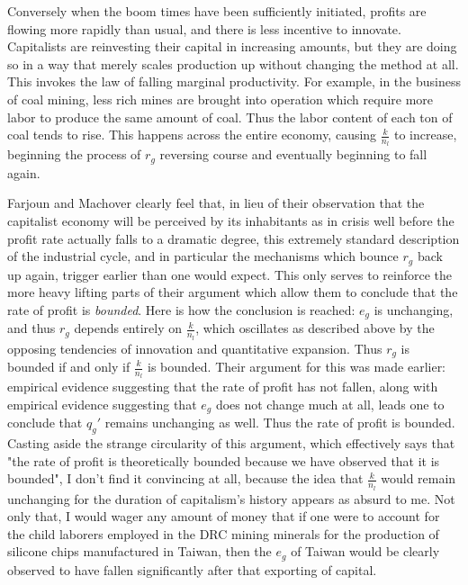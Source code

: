 Conversely when the boom times have been sufficiently initiated, profits are flowing more rapidly than usual, and there is less incentive to innovate. Capitalists are reinvesting their capital in increasing amounts, but they are doing so in a way that merely scales production up without changing the method at all. This invokes the law of falling marginal productivity. For example, in the business of coal mining, less rich mines are brought into operation which require more labor to produce the same amount of coal. Thus the labor content of each ton of coal tends to rise. This happens across the entire economy, causing $\frac{k}{n_l}$ to increase, beginning the process of $r_g$ reversing course and eventually beginning to fall again. \par 
Farjoun and Machover clearly feel that, in lieu of their observation that the capitalist economy will be perceived by its inhabitants as in crisis well before the profit rate actually falls to a dramatic degree, this extremely standard description of the industrial cycle, and in particular the mechanisms which bounce $r_g$ back up again, trigger earlier than one would expect. This only serves to reinforce the more heavy lifting parts of their argument which allow them to conclude that the rate of profit is \textit{bounded}. Here is how the conclusion is reached: $e_g$ is unchanging, and thus $r_g$ depends entirely on $\frac{k}{n_l}$, which oscillates as described above by the opposing tendencies of innovation and quantitative expansion. Thus $r_g$ is bounded if and only if $\frac{k}{n_l}$ is bounded. Their argument for this was made earlier: empirical evidence suggesting that the rate of profit has not fallen, along with empirical evidence suggesting that $e_g$ does not change much at all, leads one to conclude that $q_g'$ remains unchanging as well. Thus the rate of profit is bounded. Casting aside the strange circularity of this argument, which effectively says that "the rate of profit is theoretically bounded because we have observed that it is bounded", I don't find it convincing at all, because the idea that $\frac{k}{n_l}$ would remain unchanging for the duration of capitalism's history appears as absurd to me. Not only that, I would wager any amount of money that if one were to account for the child laborers employed in the DRC mining minerals for the production of silicone chips manufactured in Taiwan, then the $e_g$ of Taiwan would be clearly observed to have fallen significantly after that exporting of capital. 

